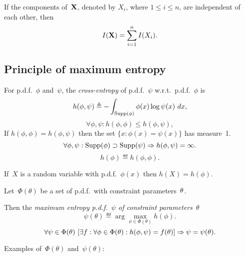 \documentclass[10pt,a4paper]{article}
\theoremstyle{plain} \newtheorem{Lem}{Lemma}
\begin{document}
If the components of~$\mathbf X$, denoted by $X_i$, where $1 \le i \le n$, are independent of each other,
then
$$ I(\mathbf X) = \sum_{i=1}^n I(X_i). $$


\subsection{Principle of maximum entropy}
For p.d.f.~$\phi$ and~$\psi$,
the {\em cross-entropy} of p.d.f.~$\psi$ w.r.t.~p.d.f.~$\phi$ is
$$ h(\phi,\psi) \triangleq - \int_{\mathrm {Supp}(\phi)} \phi(x) \log \psi(x) \ dx, $$
\begin{equation} \label{min_entropy}
 \forall \phi, \psi : h(\phi, \phi) \le h(\phi,\psi),
\end{equation}
If $h(\phi, \phi) = h(\phi,\psi)$
then the set $\{x: \phi(x)= \psi(x)\}$ has measure~1.
$$ \forall \phi, \psi : \mathrm {Supp}(\phi) \supset \mathrm {Supp}(\psi) \Rightarrow h(\phi,\psi) = \infty. $$
$$ h (\phi) \eqdef h(\phi,\phi). $$

If~$X$ is a random variable with p.d.f.~$\phi(x)$ then $h(X) = h(\phi)$.

Let~$\Phi(\theta)$ be a set of p.d.f.~with constraint parameters~$\mathbf \theta$.

Then the {\em maximum entropy p.d.f.~$\psi$ of constraint parameters~$\theta$}
$$ \psi(\theta) \eqdef \arg \max_{\phi \in \Phi(\theta)} h(\phi). $$
$$ \forall \psi \in \Phi(\theta) \
  [\exists f : \forall \phi \in \Phi(\theta): h(\phi,\psi) = f(\mathbf \theta)] \Rightarrow \psi = \psi(\theta).
$$


Examples of~$\Phi(\theta)$ and~$\psi(\theta)$:
\end{document}

